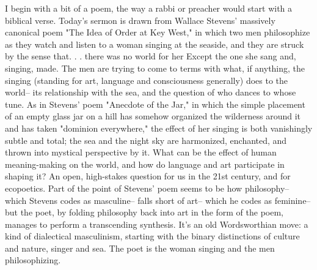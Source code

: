 \documentclass[draft]{article}
\begin{document}
\shapepar\bassshape
I begin with a bit of a poem, the way a rabbi or preacher would start with a biblical verse. Today's sermon is drawn from Wallace Stevens' massively canonical poem "The Idea of Order at Key West," in which two men philosophize as they watch and listen to a woman singing at the seaside, and they are struck by the sense that. . . there was no world for her Except the one she sang and, singing, made. The men are trying to come to terms with what, if anything, the singing (standing for art, language and consciousness generally) does to the world-- its relationship with the sea, and the question of who dances to whose tune. As in Stevens' poem "Anecdote of the Jar," in which the simple placement of an empty glass jar on a hill has somehow organized the wilderness around it and has taken "dominion everywhere," the effect of her singing is both vanishingly subtle and total; the sea and the night sky are harmonized, enchanted, and thrown into mystical perspective by it. What can be the effect of human meaning-making on the world, and how do language and art participate in shaping it? An open, high-stakes question for us in the 21st century, and for ecopoetics. Part of the point of Stevens' poem seems to be how philosophy-- which Stevens codes as masculine-- falls short of art-- which he codes as feminine-- but the poet, by folding philosophy back into art in the form of the poem, manages to perform a transcending synthesis. It's an old Wordsworthian move: a kind of dialectical masculinism, starting with the binary distinctions of culture and nature, singer and sea. The poet is the woman singing and the men philosophizing. 
\end{document}

